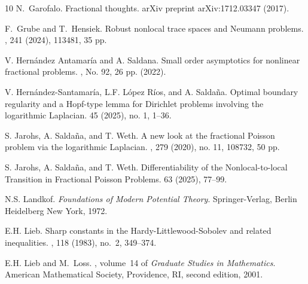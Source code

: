 \documentclass[notitlepage,11pt,reqno]{amsart}
\theoremstyle{definition}
\numberwithin{equation}{section}
\begin{document}
\begin{thebibliography}{10}
 N.~Garofalo. 
\newblock Fractional thoughts. arXiv preprint arXiv:1712.03347 (2017).


F.~Grube and T.~Hensiek.
\newblock Robust nonlocal trace spaces and Neumann problems.
, 241 (2024), 113481, 35 pp.

V. Hern\'andez Antamar\'ia and  A. Saldana.   
\newblock Small order asymptotics for nonlinear fractional problems.
, No. 92, 26 pp. (2022).

V. Hernández-Santamaría, L.F. López Ríos, and A. Saldaña.
\newblock Optimal boundary regularity and a Hopf-type lemma for Dirichlet problems involving the logarithmic Laplacian. 
 45 (2025), no. 1, 1–36.


S. Jarohs, A. Saldaña, and T. Weth.
\newblock A new look at the fractional {P}oisson problem via the logarithmic {L}aplacian.
, 279 (2020), no. 11, 108732, 50 pp.

S. Jarohs, A. Saldaña, and T. Weth. 
\newblock Differentiability of the Nonlocal-to-local Transition in Fractional Poisson Problems. 
 63 (2025), 77--99.

N.S. Landkof.
\newblock  
{\em Foundations of Modern Potential Theory}.
\newblock 
 Springer-Verlag, Berlin Heidelberg New York, 1972.

E.H. Lieb.
\newblock Sharp constants in the {H}ardy-{L}ittlewood-{S}obolev and related
  inequalities.
, 118 (1983), no.~2, 349--374.

E.H. Lieb and M.~Loss.
, volume~14 of {\em Graduate Studies in Mathematics}.
\newblock American Mathematical Society, Providence, RI, second edition, 2001.



\end{thebibliography}
\end{document}
